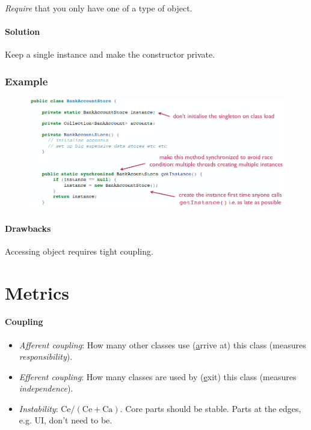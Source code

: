 \documentclass[twocolumn,english]{article}
\begin{document}
\emph{Require} that you only have one of a type of object.

\paragraph{Solution}

Keep a single instance and make the constructor private.

\subsubsection*{Example}

\begin{figure}[H]
\centering{}\includegraphics[width=0.6\columnwidth]{img/singleton}
\end{figure}

\paragraph{Drawbacks}

Accessing object requires tight coupling.

\section{Metrics}

\paragraph{Coupling}
\begin{itemize}
\item \emph{Afferent coupling}: How many other classes use (\uline{a}rrive
at) this class (measures \emph{responsibility}).
\item \emph{Efferent coupling}: How many classes are used by (\uline{e}xit)
this class (measures \emph{independence}).
\item \emph{Instability}: $\text{Ce}/\left(\text{Ce}+\text{Ca}\right)$.
Core parts should be stable. Parts at the edges, e.g. UI, don't need
to be.
\end{itemize}
\end{document}
